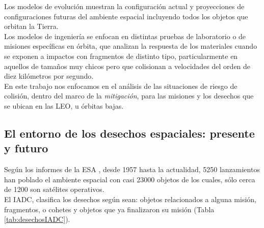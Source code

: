 Los modelos de evoluci\'on muestran la configuraci\'on actual y proyecciones de configuraciones futuras del ambiente espacial incluyendo todos los objetos que orbitan la Tierra.\\

Los modelos de ingenier\'ia se enfocan en distintas pruebas de laboratorio o de misiones espec\'ificas en \'orbita, que analizan la respuesta de los materiales cuando se exponen a impactos con fragmentos de distinto tipo, particularmente en aquellos de tama\~nos muy chicos pero que colisionan a velocidades del orden de diez kil\'ometros por segundo.\\

En este trabajo nos enfocamos en el an\'alisis de las situaciones de riesgo de colisi\'on, dentro del marco de la {\it{mitigaci\'on}}, para las misiones y los desechos que se ubican en las  \ac{LEO}, u \'orbitas bajas.\\

\subsection*{El entorno de los desechos espaciales: presente y futuro}
Seg\'un los informes de la \ac{ESA} \citep{esaSD}, desde 1957 hasta la actualidad, 5250 lanzamientos han poblado el ambiente espacial con casi 23000 objetos de los cuales, s\'olo cerca de 1200 son sat\'elites operativos.\\

El \ac{IADC}, clasifica los desechos seg\'un sean: objetos relacionados a alguna misi\'on, fragmentos, o cohetes y objetos que ya finalizaron su misi\'on (Tabla \ref{tab:desechosIADC}).\\

